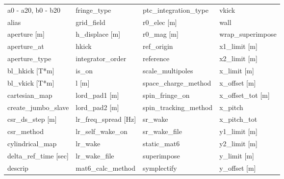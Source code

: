  \begin{tabular}{llll} \toprule
a0 - a20, b0 - b20               & fringe_type                      & ptc_integration_type             & vkick                            \\
alias                            & grid_field                       & r0_elec [m]                      & wall                             \\
aperture [m]                     & h_displace [m]                   & r0_mag [m]                       & wrap_superimpose                 \\
aperture_at                      & hkick                            & ref_origin                       & x1_limit [m]                     \\
aperture_type                    & integrator_order                 & reference                        & x2_limit [m]                     \\
bl_hkick [T*m]                   & is_on                            & scale_multipoles                 & x_limit [m]                      \\
bl_vkick [T*m]                   & l [m]                            & space_charge_method              & x_offset [m]                     \\
cartesian_map                    & lord_pad1 [m]                    & spin_fringe_on                   & x_offset_tot [m]                 \\
create_jumbo_slave               & lord_pad2 [m]                    & spin_tracking_method             & x_pitch                          \\
csr_ds_step [m]                  & lr_freq_spread [Hz]              & sr_wake                          & x_pitch_tot                      \\
csr_method                       & lr_self_wake_on                  & sr_wake_file                     & y1_limit [m]                     \\
cylindrical_map                  & lr_wake                          & static_mat6                      & y2_limit [m]                     \\
delta_ref_time [sec]             & lr_wake_file                     & superimpose                      & y_limit [m]                      \\
descrip                          & mat6_calc_method                 & symplectify                      & y_offset [m]                     \\

\end{tabular}
